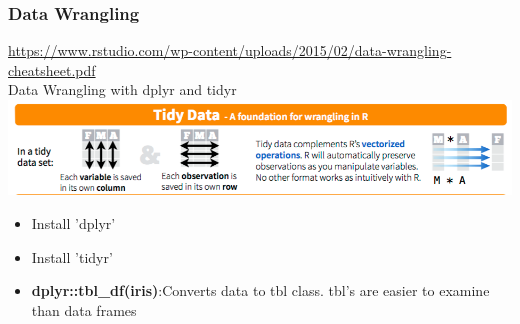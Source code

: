 \documentclass{beamer}
\begin{document}
\begin{frame}[fragile]
	\frametitle{Data Wrangling}
	\centering \tiny \url{https://www.rstudio.com/wp-content/uploads/2015/02/data-wrangling-cheatsheet.pdf}\\
	\centering \Large Data Wrangling with dplyr and tidyr\\
	\vspace{10pt}
	\includegraphics{figures/dp1.png}

	\begin{itemize}
	\small
		\pause
		\item Install 'dplyr'
		\item Install 'tidyr'
	\item \textbf{dplyr::tbl\_df(iris)}:Converts data to tbl class. tbl's are easier to examine than data frames


\end{itemize}
\end{frame}
\end{document}
